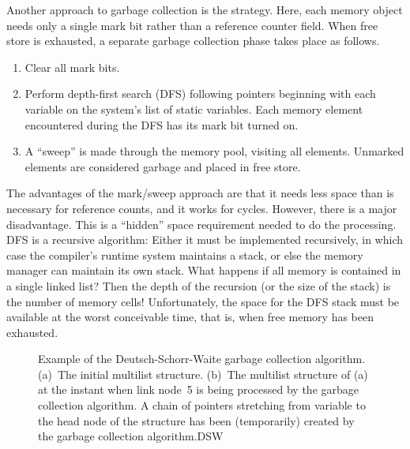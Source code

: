 Another approach to garbage collection is the 
strategy.
Here, each memory object needs only a single mark bit rather
than a reference counter field.
When free store is exhausted, a separate garbage collection phase
takes place as follows.

\begin{enumerate}

\item
Clear all mark bits.

\item
Perform depth-first search (DFS) following pointers beginning with
each variable on the system's list of
static variables. 
Each memory element encountered during the DFS has its mark bit turned
on.

\item
A ``sweep'' is made through the memory pool, visiting all elements.
Unmarked elements are considered garbage and placed in
free store.
\end{enumerate}

The advantages of the mark/sweep approach are that it needs less
space than is necessary for reference counts, and it works for cycles.
However, there is a major disadvantage.
This is a ``hidden'' space requirement needed to do the processing.
DFS is a recursive algorithm:
Either it must be implemented recursively, in which case the compiler's
runtime system maintains a stack,
or else the memory manager can maintain its own stack.
What happens if all memory is contained in a single linked list?
Then the depth of the recursion (or the size of the stack) is the
number of memory cells!
Unfortunately, the space for the DFS stack must be available at the
worst conceivable time, that is, when free memory has been exhausted.


\begin{figure}
\smallskip

{Example of the Deutsch-Schorr-Waite garbage collection algorithm.
(a)~The initial multilist structure.
(b)~The multilist structure of (a) at the instant when link node~5 is
being processed by the garbage collection algorithm.
A chain of pointers stretching from variable  to the head
node of the structure has been (temporarily) created by the garbage
collection algorithm.}{DSW}
\bigskip\smallskip
\end{figure}

